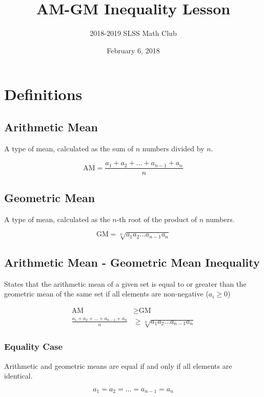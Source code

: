 \documentclass[12pt]{article}
\title{AM-GM Inequality Lesson\vspace{-3mm}}
\author{2018-2019 SLSS Math Club\vspace{-5mm}}
\date{February 6, 2018\vspace{-5mm}}
\begin{document}
\maketitle

\section{Definitions}
\subsection{Arithmetic Mean}
A type of mean, calculated as the sum of $n$ numbers divided by $n$.

\begin{equation*}
    \text{AM} = \frac{a_{1} + a_{2} + \dots + a_{n - 1} + a_{n}}{n}
\end{equation*}

\subsection{Geometric Mean}
A type of mean, calculated as the $n$-th root of the product of $n$ numbers.

\begin{equation*}
    \text{GM} = \sqrt[n]{a_{1} a_{2} \dots a_{n - 1} a_{n}}
\end{equation*}

\subsection{Arithmetic Mean - Geometric Mean Inequality}
States that the arithmetic mean of a given set is equal to or greater than the geometric mean of the same set if all elements are non-negative ($a_i \geq 0$)

\begin{align*}
    \text{AM} & \geq \text{GM} \\
     \frac{a_{1} + a_{2} + \dots + a_{n - 1} + a_{n}}{n} & \geq \sqrt[n]{a_{1} a_{2} \dots a_{n - 1} a_{n}}
\end{align*}

\subsubsection{Equality Case}
Arithmetic and geometric means are equal if and only if all elements are identical.

\begin{equation*}
    a_{1} = a_{2} = \dots = a_{n - 1} = a_{n}
\end{equation*}
\end{document}
